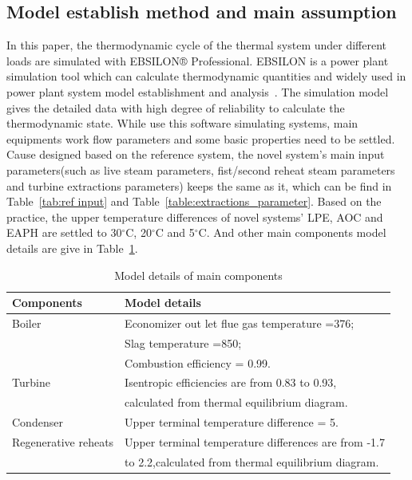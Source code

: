 \documentclass[preprint,12pt]{elsarticle}
\begin{document}
\subsection{Model establish method and main assumption}
\label{ssub3:modle description}
In this paper, the thermodynamic cycle of the thermal system under different loads are simulated with EBSILON® Professional.
EBSILON is a power plant simulation tool which can calculate thermodynamic quantities and widely used in power plant system model establishment and analysis~\cite{Li2015Integrated,Yao2017Multi}. 
The simulation model gives the detailed data with high degree of reliability to calculate the thermodynamic state.
While use this software simulating systems, main equipments work flow parameters and some basic properties need to be settled.
Cause designed based on the reference system, the novel system's main input parameters(such as live steam parameters, fist/second reheat steam parameters and turbine extractions parameters) keeps the same as it, which can be find in Table~\ref{tab:ref input} and Table~\ref{table:extractions_parameter}.
Based on the practice, the upper temperature differences of novel systems' LPE, AOC and EAPH are settled to 30$^\circ$C, 20$^\circ$C and 5$^\circ$C. 
And other main components model details are give in Table~\ref{table:model_details}. 

\begin{table}
\caption{Model details of main components}
\label{table:model_details}
\begin{centering}
\begin{tabular}{ll}
\toprule 
Components 				& Model details\tabularnewline
\midrule
Boiler         			& Economizer out let flue gas temperature =376\textcelsius ;\tabularnewline
 						& Slag temperature =850\textcelsius ;\tabularnewline
 						& Combustion efficiency = 0.99.\tabularnewline
Turbine 				& Isentropic efficiencies are from 0.83 to 0.93, \tabularnewline
 						& calculated from thermal equilibrium diagram.\tabularnewline
Condenser 				& Upper terminal temperature difference = 5\textcelsius .\tabularnewline
Regenerative reheats 	& Upper terminal temperature differences are from -1.7\textcelsius{}  \tabularnewline
 						& to 2.2\textcelsius ,calculated from thermal equilibrium diagram.\tabularnewline
\bottomrule
\end{tabular}
\par\end{centering}
\end{table}
\end{document}

